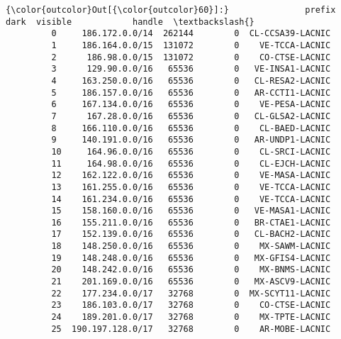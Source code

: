 \documentclass[11pt]{article}
\begin{document}
\begin{Verbatim}[commandchars=\\\{\}]
{\color{outcolor}Out[{\color{outcolor}60}]:}               prefix    dark  visible            handle  \textbackslash{}
         0     186.172.0.0/14  262144        0  CL-CCSA39-LACNIC   
         1     186.164.0.0/15  131072        0    VE-TCCA-LACNIC   
         2      186.98.0.0/15  131072        0    CO-CTSE-LACNIC   
         3      129.90.0.0/16   65536        0   VE-INSA1-LACNIC   
         4     163.250.0.0/16   65536        0   CL-RESA2-LACNIC   
         5     186.157.0.0/16   65536        0   AR-CCTI1-LACNIC   
         6     167.134.0.0/16   65536        0    VE-PESA-LACNIC   
         7      167.28.0.0/16   65536        0   CL-GLSA2-LACNIC   
         8     166.110.0.0/16   65536        0    CL-BAED-LACNIC   
         9     140.191.0.0/16   65536        0   AR-UNDP1-LACNIC   
         10     164.96.0.0/16   65536        0    CL-SRCI-LACNIC   
         11     164.98.0.0/16   65536        0    CL-EJCH-LACNIC   
         12    162.122.0.0/16   65536        0    VE-MASA-LACNIC   
         13    161.255.0.0/16   65536        0    VE-TCCA-LACNIC   
         14    161.234.0.0/16   65536        0    VE-TCCA-LACNIC   
         15    158.160.0.0/16   65536        0   VE-MASA1-LACNIC   
         16    155.211.0.0/16   65536        0   BR-CTAE1-LACNIC   
         17    152.139.0.0/16   65536        0   CL-BACH2-LACNIC   
         18    148.250.0.0/16   65536        0    MX-SAWM-LACNIC   
         19    148.248.0.0/16   65536        0   MX-GFIS4-LACNIC   
         20    148.242.0.0/16   65536        0    MX-BNMS-LACNIC   
         21    201.169.0.0/16   65536        0   MX-ASCV9-LACNIC   
         22    177.234.0.0/17   32768        0  MX-SCYT11-LACNIC   
         23    186.103.0.0/17   32768        0    CO-CTSE-LACNIC   
         24    189.201.0.0/17   32768        0    MX-TPTE-LACNIC   
         25  190.197.128.0/17   32768        0    AR-MOBE-LACNIC   
         

\end{Verbatim}
\end{document}
